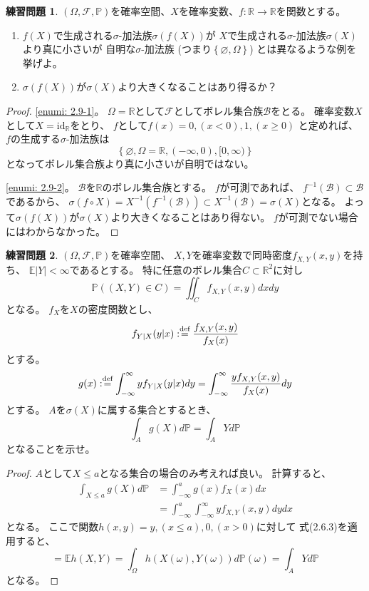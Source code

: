 \documentclass[uplatex]{jsarticle}
\theoremstyle{definition}
\newtheorem{prob}[prob]{練習問題}
\renewcommand{\emptyset}{\varnothing}
\def\id{\mathrm{id}}
\def\R{\mathbb{R}}
\def\P{\mathbb{P}}
\def\E{\mathbb{E}}
\def\mcB{\mathcal{B}}
\def\mcF{\mathcal{F}}
\def\dfn{:\overset{\mbox{{\scriptsize def}}}{=}}
\begin{document}
\begin{prob}\label{prob: 2.9}
  \((\Omega,\mcF,\P)\)を確率空間、\(X\)を確率変数、\(f:\R\to \R\)を関数とする。
  \begin{enumerate}
    \item \label{enumi: 2.9-1}
    \(f(X)\)で生成される\(\sigma\)-加法族\(\sigma(f(X))\)が
    \(X\)で生成される\(\sigma\)-加法族\(\sigma(X)\)より真に小さいが
    自明な\(\sigma\)-加法族
    (つまり\(\left\{\emptyset,\Omega\right\}\))
    とは異なるような例を挙げよ。
    \item \label{enumi: 2.9-2}
    \(\sigma(f(X))\)が\(\sigma(X)\)より大きくなることはあり得るか？
  \end{enumerate}
\end{prob}

\begin{proof}
  \ref{enumi: 2.9-1}。
  \(\Omega=\R\)として\(\mcF\)としてボレル集合族\(\mcB\)をとる。
  確率変数\(X\)として\(X=\id_{\R}\)をとり、
  \(f\)として\(f(x) = 0 , (x < 0), 1 , (x \geq 0)\)
  と定めれば、
  \(f\)の生成する\(\sigma\)-加法族は
  \[
  \left\{ \emptyset , \Omega = \R , (-\infty,0) , [0,\infty)\right\}
  \]
  となってボレル集合族より真に小さいが自明ではない。

  \ref{enumi: 2.9-2}。
  \(\mcB\)を\(\R\)のボレル集合族とする。
  \(f\)が可測であれば、
  \(f^{-1}(\mcB)\subset \mcB\)であるから、
  \(\sigma(f\circ X) = X^{-1}(f^{-1}(\mcB))
  \subset X^{-1}(\mcB) = \sigma(X)\)となる。
  よって\(\sigma(f(X))\)が\(\sigma(X)\)より大きくなることはあり得ない。
  \(f\)が可測でない場合にはわからなかった。
\end{proof}



\begin{prob}\label{prob: 2.10}
  \((\Omega,\mcF,\P)\)を確率空間、
  \(X,Y\)を確率変数で同時密度\(f_{X,Y}(x,y)\)を持ち、
  \(\E|Y|<\infty\)であるとする。
  特に任意のボレル集合\(C\subset \R^2\)に対し
  \[
  \P((X,Y)\in C) = \iint_Cf_{X,Y}(x,y)dxdy
  \]
  となる。
  \(f_X\)を\(X\)の密度関数とし、
  \[f_{Y|X}(y|x) \dfn \frac{f_{X,Y}(x,y)}{f_X(x)}\]
  とする。
  \[
  g(x) \dfn \int_{-\infty}^\infty yf_{Y|X}(y|x)dy
  = \int_{-\infty}^\infty \frac{yf_{X,Y}(x,y)}{f_X(x)} dy
  \]
  とする。
  \(A\)を\(\sigma(X)\)に属する集合とするとき、
  \[
  \int_A g(X) d\P = \int_A Y d\P
  \]
  となることを示せ。
\end{prob}

\begin{proof}
  \(A\)として\(X \leq a\)となる集合の場合のみ考えれば良い。
  計算すると、
  \begin{align*}
    \int_{X\leq a}g(X)d\P &= \int_{-\infty}^a g(x)f_X(x) dx \\
    &= \int_{-\infty}^a\int_{-\infty}^\infty yf_{X,Y}(x,y) dydx
  \end{align*}
  となる。
  ここで関数\(h(x,y) = y , (x \leq a) , 0 , (x>0)\)に対して
  式(2.6.3)を適用すると、
  \[
  = \E h(X,Y) = \int_{\Omega}h(X(\omega),Y(\omega))d\P(\omega)
  = \int_A Y d\P
  \]
  となる。
\end{proof}
\end{document}
